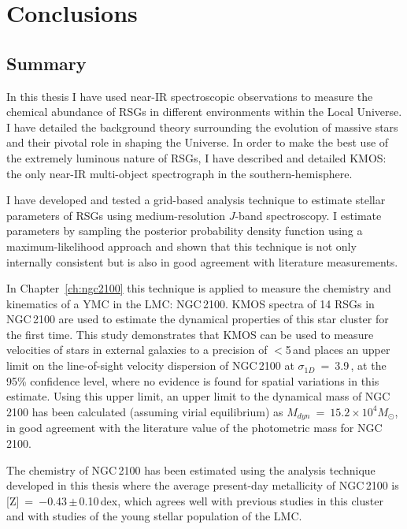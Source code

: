 \chapter{Conclusions}
\label{ch:conclusions}

\section{Summary} %
\label{sec:exec-sum}
In this thesis I have used near-IR spectroscopic observations to measure the chemical abundance of RSGs in different environments within the Local Universe.
I have detailed the background theory surrounding the evolution of massive stars and their pivotal role in shaping the Universe.
In order to make the best use of the extremely luminous nature of RSGs, I have described and detailed KMOS: the only near-IR multi-object spectrograph in the southern-hemisphere.

I have developed and tested a grid-based analysis technique to estimate stellar parameters of RSGs using medium-resolution $J$-band spectroscopy.
I estimate parameters by sampling the posterior probability density function using a maximum-likelihood approach and shown that this technique is not only internally consistent but is also in good agreement with literature measurements.

In Chapter~\ref{ch:ngc2100} this technique is applied to measure the chemistry and kinematics of a YMC in the LMC: NGC\,2100.
KMOS spectra of 14 RSGs in NGC\,2100 are used to estimate the dynamical properties of this star cluster for the first time.
This study demonstrates that KMOS can be used to measure velocities of stars in external galaxies to a precision of $<$5\,\kms and places an upper limit on the line-of-sight velocity dispersion of NGC\,2100 at $\sigma_{1D}$~=~3.9\,\kms, at the 95\% confidence level, where no evidence is found for spatial variations in this estimate.
Using this upper limit, an upper limit to the dynamical mass of NGC\,2100 has been calculated (assuming virial equilibrium) as $M_{dyn}$~=~$15.2\times 10^{4}M_{\odot}$, in good agreement with the literature value of the photometric mass for NGC\,2100.

The chemistry of NGC\,2100 has been estimated using the analysis technique developed in this thesis where the average present-day metallicity of NGC\,2100 is [Z]~=~$-$0.43\,$\pm$\,0.10\,dex, which agrees well with previous studies in this cluster and with studies of the young stellar population of the LMC.

